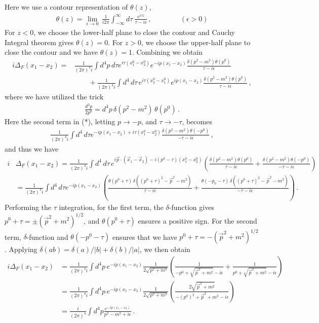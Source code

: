 \documentclass[11pt, onesided]{book}
\theoremstyle{break}
\theoremstyle{break}
\begin{document}
Here we use a contour representation of $\theta(z)$,
\begin{align*}
\theta(z) = \lim_{\epsilon \to 0}\,\frac{1}{i2\pi}\int_{-\infty}^\infty d\tau \ \frac{e^{i\tau z}}{\tau - i\epsilon}\,,\qquad\qquad (\epsilon>0)
\end{align*}
For $z<0$, we choose the lower-half plane to close the contour and Cauchy Integral theorem gives $\theta(z) = 0$. For $z>0$, we choose the upper-half plane to close the contour and we have $\theta(z) = 1$. Combining we obtain
\begin{align*}
i\Delta_F(x_1 - x_2) =& \frac{1}{(2\pi)^4 i}\int d^4p \, d\tau e^{i\tau(x_1^0 - x_2^0)}e^{-ip(x_1-x_2)} \frac{\delta(p^2- m^2)\theta(p^0)}{\tau -i\epsilon} \\
&{}\qquad + \frac{1}{(2\pi)^4i}\int d^4\,d\tau\, e^{i\tau(x_2^0 - x_1^0)} e^{ip(x_1 - x_2)} \frac{\delta(p^2 - m^2)\theta(p^0)}{\tau - i\epsilon}\,, \tag{*}
\end{align*}
where we have utilized the trick
\begin{align*}
\frac{d^3p}{2p^0} = d^4p \, \delta(p^2 - m^2)\, \theta(p^0)\,.
\end{align*}
Here the second term in (*), letting $p \to -p$, and $\tau \to -\tau$, becomes
\begin{align*}
\frac{1}{(2\pi)^4i}\int d^4\, d\tau e^{-ip(x_1-x_2) +i\tau(x_1^0 - x_2^0)}\frac{\delta(p^2 - m^2)\theta(-p^0)}{-\tau - i\epsilon}\,,
\end{align*}
and thus we have
\begin{align*}
i&\Delta_F(x_1-x_2) = \frac{1}{(2\pi)^{4}i}\int d^4\, d\tau\, e^{i\vec{p}\cdot (\vec{x}_1 - \vec{x}_2) - i(p^0 -\tau) (x_1^0 - x_2^0)}\left( \frac{\delta(p^2 - m^2) \theta(p^0)}{\tau - i\epsilon} + \frac{\delta(p^2 - m^2) \theta(-p^0)}{-\tau - i\epsilon}\right)\\
&= \frac{1}{(2\pi)^4i}\int d^4\, d\tau e^{-ip(x_1-x_2)} \left( \frac{\theta(p^0+\tau)\, \delta((p^0 +\tau)^2 - \vec{p}^2 - m^2)}{\tau - i\epsilon} + \frac{\theta(-p_0 -\tau)\, \delta((p^0+\tau)^2 -\vec{p}^2 -m^2)}{-\tau - i\epsilon} \right)\,.
\end{align*}
Performing the $\tau$ integration, for the first term, the $\delta$-function gives $p^0 + \tau = \pm ({\vec{p}^2 + m^2})^{1/2}$, and $\theta(p^0 +\tau)$ ensures a positive sign. For the second term, $\delta$-function and $\theta(-p^0 -\tau)$ ensures that we have $p^0 + \tau = -({\vec{p}^2 + m^2})^{1/2}$. Applying $\delta(ab) = \delta(a)/|b| + \delta(b) /|a|$, we then obtain
\begin{align*}
i\Delta_F (x_1 - x_2)
&= \frac{1}{(2\pi)^4 i}\int d^4p\, e^{-ip(x_1-x_2)} \frac{1}{2\sqrt{p^2 + m^2}} \left( \frac{1}{-p^0 +\sqrt{\vec{p}^2 + m^2}-i\epsilon } +\frac{1}{p^0 + \sqrt{\vec{p}^2 + m^2} -i\epsilon} \right)\\
&= \frac{1}{(2\pi)^4 i}\int d^4p\, e^{-ip(x_1-x_2)} \frac{1}{2\sqrt{p^2 + m^2}} \left( \frac{2\sqrt{\vec{p}^2 + m^2}}{-(p^0)^2 + \vec{p}^2 + m^2 -i\epsilon}  \right)\\
&= \frac{i}{(2\pi)^4}\int d^4p \frac{e^{-ip(x_1 - x_2)}}{p^2 -m^2 + i\epsilon}\,.
\end{align*}
\end{document}
